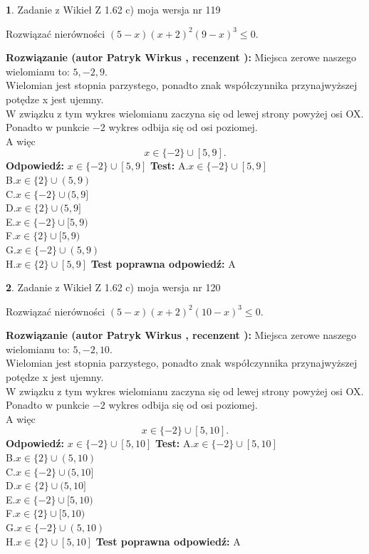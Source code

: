 \documentclass[12pt, a4paper]{article}
\theoremstyle{definition} %
\newtheorem{zad}{}
\newcommand{\zadStart}[1]{\begin{zad}#1\newline}
\newcommand{\zadStop}{\end{zad}}
\newcommand{\rozwStart}[2]{\noindent \textbf{Rozwiązanie (autor #1 , recenzent #2): }\newline}
\newcommand{\rozwStop}{\newline}
\newcommand{\odpStart}{\noindent \textbf{Odpowiedź:}\newline}
\newcommand{\odpStop}{\newline}
\newcommand{\testStart}{\noindent \textbf{Test:}\newline}
\newcommand{\testStop}{\newline}
\newcommand{\kluczStart}{\noindent \textbf{Test poprawna odpowiedź:}\newline}
\newcommand{\kluczStop}{\newline}
\begin{document}
\zadStart{Zadanie z Wikieł Z 1.62 c) moja wersja nr 119}

Rozwiązać nierówności $(5-x)(x+2)^{2}(9-x)^{3}\le0$.
\zadStop
\rozwStart{Patryk Wirkus}{}
Miejsca zerowe naszego wielomianu to: $5, -2, 9$.\\
Wielomian jest stopnia parzystego, ponadto znak współczynnika przy\linebreak najwyższej potędze x jest ujemny.\\ W związku z tym wykres wielomianu zaczyna się od lewej strony powyżej osi OX.\\
Ponadto w punkcie $-2$ wykres odbija się od osi poziomej.\\
A więc $$x \in \{-2\} \cup [5,9].$$
\rozwStop
\odpStart
$x \in \{-2\} \cup [5,9]$
\odpStop
\testStart
A.$x \in \{-2\} \cup [5,9]$\\
B.$x \in \{2\} \cup (5,9)$\\
C.$x \in \{-2\} \cup (5,9]$\\
D.$x \in \{2\} \cup (5,9]$\\
E.$x \in \{-2\} \cup [5,9)$\\
F.$x \in \{2\} \cup [5,9)$\\
G.$x \in \{-2\} \cup (5,9)$\\
H.$x \in \{2\} \cup [5,9]$
\testStop
\kluczStart
A
\kluczStop



\zadStart{Zadanie z Wikieł Z 1.62 c) moja wersja nr 120}

Rozwiązać nierówności $(5-x)(x+2)^{2}(10-x)^{3}\le0$.
\zadStop
\rozwStart{Patryk Wirkus}{}
Miejsca zerowe naszego wielomianu to: $5, -2, 10$.\\
Wielomian jest stopnia parzystego, ponadto znak współczynnika przy\linebreak najwyższej potędze x jest ujemny.\\ W związku z tym wykres wielomianu zaczyna się od lewej strony powyżej osi OX.\\
Ponadto w punkcie $-2$ wykres odbija się od osi poziomej.\\
A więc $$x \in \{-2\} \cup [5,10].$$
\rozwStop
\odpStart
$x \in \{-2\} \cup [5,10]$
\odpStop
\testStart
A.$x \in \{-2\} \cup [5,10]$\\
B.$x \in \{2\} \cup (5,10)$\\
C.$x \in \{-2\} \cup (5,10]$\\
D.$x \in \{2\} \cup (5,10]$\\
E.$x \in \{-2\} \cup [5,10)$\\
F.$x \in \{2\} \cup [5,10)$\\
G.$x \in \{-2\} \cup (5,10)$\\
H.$x \in \{2\} \cup [5,10]$
\testStop
\kluczStart
A
\kluczStop
\end{document}
